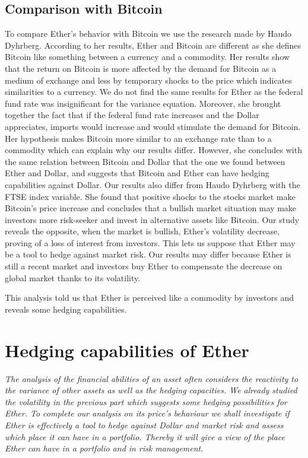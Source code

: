 \documentclass[11pt]{report}
\begin{document}
\section{Comparison with Bitcoin}
To compare Ether’s behavior with Bitcoin we use the research made by Haudo Dyhrberg\cite{HAUDO2}.\newline
According to her results, Ether and Bitcoin are different as she defines Bitcoin like something between a currency and a commodity. Her results show that the return on Bitcoin is more affected by the demand for Bitcoin as a medium of exchange and less by temporary shocks to the price which indicates similarities to a currency. We do not find the same results for Ether as the federal fund rate was insignificant for the variance equation. Moreover, she brought together the fact that if the federal fund rate increases and the Dollar appreciates, imports would increase and would stimulate the demand for Bitcoin. Her hypothesis makes Bitcoin more similar to an exchange rate than to a commodity which can explain why our results differ. However, she concludes with the same relation between Bitcoin and Dollar that the one we found between Ether and Dollar, and suggests that Bitcoin and Ether can have hedging capabilities against Dollar.\newline
Our results also differ from Haudo Dyhrberg with the FTSE index variable. She found that positive shocks to the stocks market make Bitcoin’s price increase and concludes that a bullish market situation may make investors more risk-seeker and invest in alternative assets like Bitcoin. Our study reveals the opposite, when the market is bullish, Ether’s volatility decrease, proving of a loss of interest from investors. This lets us suppose that Ether may be a tool to hedge against market risk. Our results may differ because Ether is still a recent market and investors buy Ether to compensate the decrease on global market thanks to its volatility.\smallbreak

This analysis told us that Ether is perceived like a commodity by investors and reveals some hedging capabilities. 

\chapter{Hedging capabilities of Ether}

\textit{The analysis of the financial abilities of an asset often considers the reactivity to the variance of other assets as well as the hedging capacities. We already studied the volatility in the previous part which suggests some hedging possibilities for Ether. To complete our analysis on its price’s behaviour we shall investigate if Ether is effectively a tool to hedge against Dollar and market risk and assess which place it can have in a portfolio. Thereby it will give a view of the place Ether can have in a portfolio and in risk management.}
\end{document}
